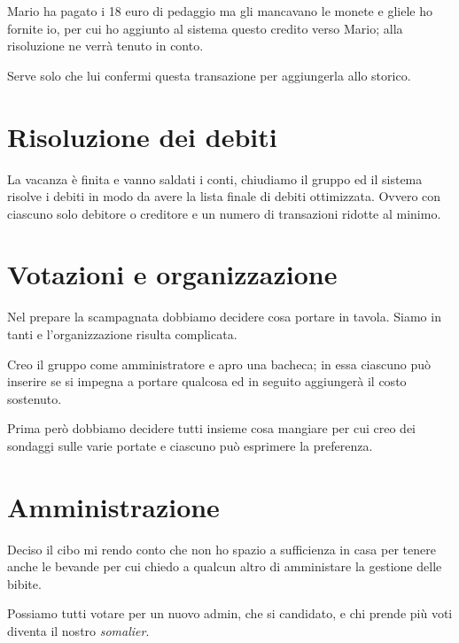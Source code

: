 \documentclass[10pt,a4paper]{article}
\begin{document}
	Mario ha pagato i 18 euro di pedaggio ma gli mancavano le monete e gliele ho fornite io, per cui ho aggiunto al sistema questo credito verso Mario; alla risoluzione ne verrà tenuto in conto.
	
	Serve solo che lui confermi questa transazione per aggiungerla allo storico.
	
	\section{Risoluzione dei debiti}
	
	La vacanza è finita e vanno saldati i conti, chiudiamo il gruppo ed il sistema risolve i debiti in modo da avere la lista finale di debiti ottimizzata. Ovvero con ciascuno solo debitore o creditore e un numero di transazioni ridotte al minimo.
	
	
	\section{Votazioni e organizzazione}
	
	Nel prepare la scampagnata dobbiamo decidere cosa portare in tavola. Siamo in tanti e l'organizzazione risulta complicata.
	
	Creo il gruppo come amministratore e apro una bacheca; in essa ciascuno può inserire se si impegna a portare qualcosa ed in seguito aggiungerà il costo sostenuto.
	
	Prima però dobbiamo decidere tutti insieme cosa mangiare per cui creo dei sondaggi sulle varie portate e ciascuno può esprimere la preferenza.
	
	\section{Amministrazione}
	
	Deciso il cibo mi rendo conto che non ho spazio a sufficienza in casa per tenere anche le bevande per cui chiedo a qualcun altro di amministare la gestione delle bibite.
	
	Possiamo tutti votare per un nuovo admin, che si candidato, e chi prende più voti diventa il nostro \textit{somalier}.
	
	
\end{document}
